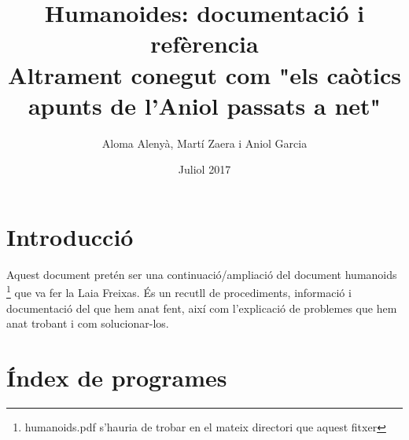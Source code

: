 \documentclass{article}
\title{Humanoides: documentació i refèrencia \\ \small{Altrament conegut com "els caòtics apunts de l'Aniol passats a net"}}
\author{Aloma Alenyà, Martí Zaera i Aniol Garcia}
\date{Juliol 2017}
\begin{document}
\maketitle
\section{Introducció}
Aquest document pretén ser una continuació/ampliació del document humanoids \footnote{humanoids.pdf s'hauria de trobar en el mateix directori que aquest fitxer} que va fer la Laia Freixas. És un recutll de procediments, informació i documentació del que hem anat fent, així com l'explicació de problemes que hem anat trobant i com solucionar-los. 

\section{Índex de programes}
\end{document}

